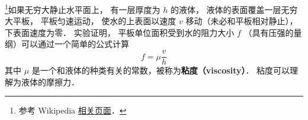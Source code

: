 
\begin{issues}
\issueDraft
\end{issues}

\footnote{参考 Wikipedia \href{https://en.wikipedia.org/wiki/Viscosity}{相关页面}．}如果无穷大静止水平面上， 有一层厚度为 $h$ 的液体， 液体的表面覆盖一层无穷大平板， 平板匀速运动， 使水的上表面以速度 $v$ 移动（未必和平板相对静止）， 下表面速度为零． 实验证明， 平板单位面积受到水的阻力大小 $f$ （具有压强的量纲）可以通过一个简单的公式计算
\begin{equation}
f = \mu \frac{v}{h}
\end{equation}
其中 $\mu$ 是一个和液体的种类有关的常数，被称为\textbf{粘度（viscosity）}． 粘度可以理解为液体的摩擦力．
